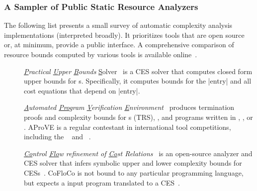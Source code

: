 \subsubsection{A Sampler of Public Static Resource Analyzers}
\label{resource-analysis-tools}

The following list presents a small survey of automatic complexity analysis
implementations (interpreted broadly). It prioritizes tools that are open source
or, at minimum, provide a public interface. A comprehensive comparison of
resource bounds computed by various tools is available
online~\cite{flores_experiments}.

\begin{description}

\item[\href{https://costa.fdi.ucm.es/~costa/pubs/pubs.php}{}]
      \emph{\underline{P}ractical \underline{U}pper \underline{B}ounds}
      \underline{S}olver~\cite{albert2010}
      is a CES solver that computes closed form upper bounds for s. Specifically, it computes bounds for the \pr|entry| and
      all cost equations that depend on \pr|entry|.

\item[\href{https://aprove.informatik.rwth-aachen.de}{}]
      \emph{\underline{A}utomated \underline{Pro}gram \underline{V}erification
      \underline{E}nvironment}~\cite{giesl2016} produces termination proofs and
      complexity bounds for s (TRS), , and programs written in , ,
      or .
      AProVE is a regular contestant in international tool competitions,
      including the
      \href{https://termination-portal.org/wiki/Termination_Competition}%
      {}~\cite{giesl2019}
      and \href{https://sv-comp.sosy-lab.org}%
      {}~\cite{beyer2022}.

\item[\href{https://github.com/aeflores/CoFloCo}{}]
      \emph{\underline{Co}ntrol \underline{Flo}w refinement of \underline{Co}st
      Relations}~\cite{floresmontoya2014}
      is an open-source analyzer and CES solver that infers symbolic upper and
      lower complexity bounds for CESs~\cite{flores-montoya2016}.
      CoFloCo is not bound to any particular programming language, but expects a
      input program translated to a CES~\cite{flores2016}.


\end{description}
